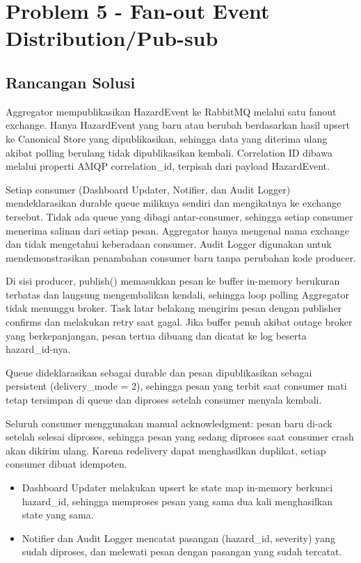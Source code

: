 \chapter{Problem 5 - Fan-out Event Distribution/Pub-sub}

\section{Rancangan Solusi}

Aggregator mempublikasikan HazardEvent ke RabbitMQ melalui satu fanout exchange. Hanya HazardEvent yang baru atau berubah berdasarkan hasil upsert ke Canonical Store yang dipublikasikan, sehingga data yang diterima ulang akibat polling berulang tidak dipublikasikan kembali. Correlation ID dibawa melalui properti AMQP correlation\_id, terpisah dari payload HazardEvent.

Setiap consumer (Dashboard Updater, Notifier, dan Audit Logger) mendeklarasikan durable queue miliknya sendiri dan mengikatnya ke exchange tersebut. Tidak ada queue yang dibagi antar-consumer, sehingga setiap consumer menerima salinan dari setiap pesan. Aggregator hanya mengenal nama exchange dan tidak mengetahui keberadaan consumer. Audit Logger digunakan untuk mendemonstrasikan penambahan consumer baru tanpa perubahan kode producer.

Di sisi producer, publish() memasukkan pesan ke buffer in-memory berukuran terbatas dan langsung mengembalikan kendali, sehingga loop polling Aggregator tidak menunggu broker. Task latar belakang mengirim pesan dengan publisher confirms dan melakukan retry saat gagal. Jika buffer penuh akibat outage broker yang berkepanjangan, pesan tertua dibuang dan dicatat ke log beserta hazard\_id-nya.

Queue dideklarasikan sebagai durable dan pesan dipublikasikan sebagai persistent (delivery\_mode = 2), sehingga pesan yang terbit saat consumer mati tetap tersimpan di queue dan diproses setelah consumer menyala kembali.

Seluruh consumer menggunakan manual acknowledgment: pesan baru di-ack setelah selesai diproses, sehingga pesan yang sedang diproses saat consumer crash akan dikirim ulang. Karena redelivery dapat menghasilkan duplikat, setiap consumer dibuat idempoten.

\begin{itemize}
\tightlist
\item
  Dashboard Updater melakukan upsert ke state map in-memory berkunci hazard\_id, sehingga memproses pesan yang sama dua kali menghasilkan state yang sama.
\item
  Notifier dan Audit Logger mencatat pasangan (hazard\_id, severity) yang sudah diproses, dan melewati pesan dengan pasangan yang sudah tercatat.
\end{itemize}

